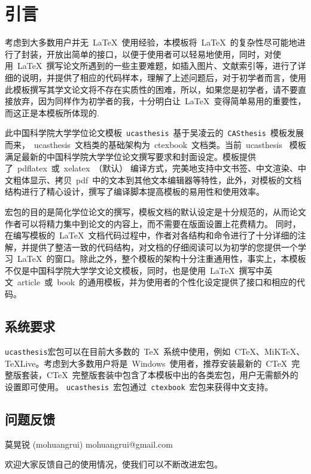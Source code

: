 
\chapter{引言}
\label{chap:introduction}

考虑到大多数用户并无~\LaTeX{}~使用经验，本模板将~\LaTeX{}~的复杂性尽可能地进行了封装，开放出简单的接口，以便于使用者可以轻易地使用，同时，对使用~\LaTeX{}~撰写论文所遇到的一些主要难题，如插入图片、文献索引等，进行了详细的说明，并提供了相应的代码样本，理解了上述问题后，对于初学者而言，使用此模板撰写其学文论文将不存在实质性的困难，所以，如果您是初学者，请不要直接放弃，因为同样作为初学者的我，十分明白让~\LaTeX{}~变得简单易用的重要性，而这正是本模板所体现的.

此中国科学院大学学位论文模板~\texttt{ucasthesis}~基于吴凌云的~\texttt{CASthesis}~模板发展而来，~ucasthesis~文档类的基础架构为~ctexbook~文档类。当前~ucasthesis~ 模板满足最新的中国科学院大学学位论文撰写要求和封面设定。模板提供了~pdflatex~或~xelatex~（默认） 编译方式，完美地支持中文书签、中文渲染、中文粗体显示、拷贝~pdf~中的文本到其他文本编辑器等特性，此外，对模板的文档结构进行了精心设计，撰写了编译脚本提高模板的易用性和使用效率。

宏包的目的是简化学位论文的撰写，模板文档的默认设定是十分规范的，从而论文作者可以将精力集中到论文的内容上，而不需要在版面设置上花费精力。 同时，在编写模板的~\LaTeX{}~文档代码过程中，作者对各结构和命令进行了十分详细的注解，并提供了整洁一致的代码结构，对文档的仔细阅读可以为初学的您提供一个学习~\LaTeX{}~的窗口。除此之外，整个模板的架构十分注重通用性，事实上，本模板不仅是中国科学院大学学文论文模板，同时，也是使用~\LaTeX{}~撰写中英文~article~或~book~的通用模板，并为使用者的个性化设定提供了接口和相应的代码。

\section{系统要求}

\texttt{ucasthesis}宏包可以在目前大多数的~\TeX{}~系统中使用，例如~C\TeX{}、MiK\TeX{}、\TeX{}Live。考虑到大多数用户将是~Windows~使用者，推荐安装最新的~C\TeX{}~完整版套装，C\TeX{}~完整版套装中包含了本模板中出的各类宏包，用户无需额外的设置即可使用。 \texttt{ucasthesis}~宏包通过~\texttt{ctexbook}~宏包来获得中文支持。

\section{问题反馈}

\begin{center}
莫晃锐 (mohuangrui) \quad mohuangrui@gmail.com
\end{center}

欢迎大家反馈自己的使用情况，使我们可以不断改进宏包。
